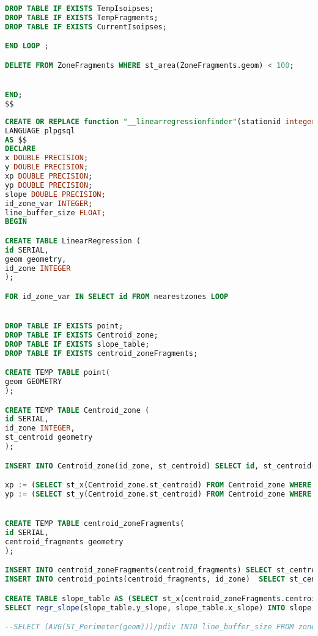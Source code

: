 \begin{lstlisting}[language=SQL]
DROP TABLE IF EXISTS TempIsoipses;
DROP TABLE IF EXISTS TempFragments;
DROP TABLE IF EXISTS CurrentIsoipses;

END LOOP ;

DELETE FROM ZoneFragments WHERE st_area(ZoneFragments.geom) < 100;


END;
$$
\end{lstlisting}

\begin{lstlisting}[language=SQL]
CREATE OR REPLACE function "__linearregressionfinder"(stationid integer, pdiv double precision) returns void
LANGUAGE plpgsql
AS $$
DECLARE
x DOUBLE PRECISION;
y DOUBLE PRECISION;
xp DOUBLE PRECISION;
yp DOUBLE PRECISION;
slope DOUBLE PRECISION;
id_zone_var INTEGER;
line_buffer_size FLOAT;
BEGIN

CREATE TABLE LinearRegression (
id SERIAL,
geom geometry,
id_zone INTEGER
);

FOR id_zone_var IN SELECT id FROM nearestzones LOOP


DROP TABLE IF EXISTS point;
DROP TABLE IF EXISTS Centroid_zone;
DROP TABLE IF EXISTS slope_table;
DROP TABLE IF EXISTS centroid_zoneFragments;

CREATE TEMP TABLE point(
geom GEOMETRY
);

CREATE TEMP TABLE Centroid_zone (
id SERIAL,
id_zone INTEGER,
st_centroid geometry
);

INSERT INTO Centroid_zone(id_zone, st_centroid) SELECT id, st_centroid(nearestzones.geom) FROM nearestzones;

xp := (SELECT st_x(Centroid_zone.st_centroid) FROM Centroid_zone WHERE Centroid_zone.id_zone = id_zone_var);
yp := (SELECT st_y(Centroid_zone.st_centroid) FROM Centroid_zone WHERE Centroid_zone.id_zone = id_zone_var);


CREATE TEMP TABLE centroid_zoneFragments(
id SERIAL,
centroid_fragments geometry
);

INSERT INTO centroid_zoneFragments(centroid_fragments) SELECT st_centroid(geom) FROM zonefragments WHERE id_zone = id_zone_var;
INSERT INTO centroid_points(centroid_fragments, id_zone)  SELECT st_centroid(geom), id_zone FROM zonefragments WHERE id_zone = id_zone_var;

CREATE TABLE slope_table AS (SELECT st_x(centroid_zoneFragments.centroid_fragments) as x_slope , st_y(centroid_zoneFragments.centroid_fragments) AS y_slope FROM centroid_zoneFragments);
SELECT regr_slope(slope_table.y_slope, slope_table.x_slope) INTO slope FROM slope_table;

--SELECT (AVG(ST_Perimeter(geom)))/pdiv INTO line_buffer_size FROM zonefragments WHERE id_zone = id_zone_var;


\end{lstlisting}
